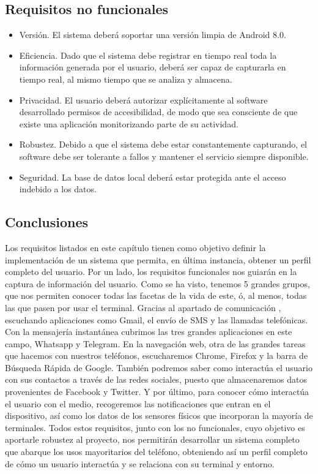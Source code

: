 \documentclass[12pt,a4paper,oneside]{book} %
\begin{document}
\subsection{Requisitos no funcionales}
\begin{itemize}
	\item Versión. El sistema deberá soportar una versión limpia de Android 8.0. 
	\item Eficiencia. Dado que el sistema debe registrar en tiempo real toda la información generada por el usuario, deberá ser capaz de capturarla en tiempo real, al mismo tiempo que se analiza y almacena. 
	\item Privacidad. El usuario deberá autorizar explícitamente al software desarrollado permisos de accesibilidad, de modo que sea consciente de que existe una aplicación monitorizando parte de su actividad.
	\item Robustez. Debido a que el sistema debe estar constantemente capturando, el software debe ser tolerante a fallos y mantener el servicio siempre disponible.  
	\item Seguridad. La base de datos local deberá estar protegida ante el acceso indebido a los datos. 
\end{itemize}
\subsection{Conclusiones}
Los requisitos listados en este capítulo tienen como objetivo definir la implementación de un sistema que permita, en última instancia, obtener un perfil completo del usuario. 
\newline \newline 
Por un lado, los requisitos funcionales nos guiarán en la captura de información del usuario. Como se ha visto, tenemos 5 grandes grupos, que nos permiten conocer todas las facetas de la vida de este, ó, al menos, todas las que pasen por usar el terminal. 
\newline \newline
Gracias al apartado de comunicación , escuchando aplicaciones como Gmail, el envío de SMS y las llamadas telefónicas. Con la mensajería instantánea cubrimos las tres grandes aplicaciones en este campo, Whatsapp y Telegram. En la navegación web, otra de las grandes tareas que hacemos con nuestros teléfonos, escucharemos Chrome, Firefox y la barra de Búsqueda Rápida de Google. 
\newline \newline 
También podremos saber como interactúa el usuario con sus contactos a través de las redes sociales, puesto que almacenaremos datos provenientes de Facebook y Twitter. Y por último, para conocer cómo interactúa el usuario con el medio, recogeremos las notificaciones que entran en el dispositivo, así como los datos de los sensores físicos que incorporan la mayoría de terminales. 
\newline \newline 
Todos estos requisitos, junto con los no funcionales, cuyo objetivo es aportarle robustez al proyecto, nos permitirán desarrollar un sistema completo que abarque los usos mayoritarios del teléfono, obteniendo así un perfil completo de cómo un usuario interactúa y se relaciona con su terminal y entorno. 
\break
\end{document}
